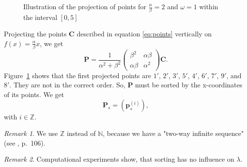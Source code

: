 \documentclass[11pt]{article}
\theoremstyle{remark}
\newtheorem{remark}{Remark}
\begin{document}
\begin{figure}[htbp]
    \centering
	\caption{Illustration of the projection of points for $\frac{\alpha}{\beta} = 2$ and $\omega = 1$ within the interval $[0, 5]$}
    \label{fig:a2o1}
\end{figure}
%
Projecting the points $\mathbf{C}$ described in equation \ref{eq:points} vertically on $f(x) = \frac{\alpha}{\beta} x$, we get
%
\begin{equation}
\mathbf{P}
= \frac{1}{\alpha^2 + \beta^2} \begin{pmatrix} \beta^2 & \alpha \beta \\ \alpha \beta & \alpha^2 \end{pmatrix} \mathbf{C}.\label{eq:c}
\end{equation}
%
Figure~\ref{fig:a2o1} shows that the first projected points are $1'$, $2'$, $3'$, $5'$, $4'$, $6'$, $7'$, $9'$, and $8'$. They are not in the correct order. So, $\mathbf{P}$ must be sorted by the x-coordinates of its points. We get
\begin{equation}
\mathbf{P}_s = \left(\mathbf{p}_s^{(i)} \right),\label{eq:sort}
\end{equation}
with $i \in \mathbb{Z}$.
%
\begin{remark}
We use $\mathbb{Z}$ instead of $\mathbb{N}$, because we have a "two-way infinite sequence" (see \cite{Senechal2009}, p.~106).
\end{remark}
%
\begin{remark}
Computational experiments show, that sorting has no influence on $\lambda$. 
\end{remark}
\end{document}
